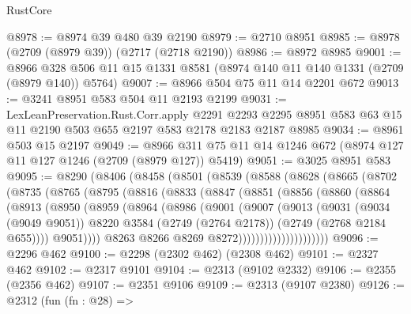 \begin{lexlean}{RustCore}
\begin{coremodule}
@8978 := @8974 @39 @480 @39 @2190
@8979 := @2710 @8951
@8985 := @8978 (@2709 (@8979 @39)) (@2717 (@2718 @2190))
@8986 := @8972 @8985
@9001 := @8966 @328 @506 @11 @15 @1331 @8581 (@8974 @140 @11 @140 @1331 (@2709 (@8979 @140)) @5764)
@9007 := @8966 @504 @75 @11 @14 @2201 @672
@9013 := @3241 @8951 @583 @504 @11 @2193 @2199
@9031 := LexLeanPreservation.Rust.Corr.apply
    @2291
    @2293
    @2295
    @8951
    @583
    @63
    @15
    @11
    @2190
    @503
    @655
    @2197
    @583
    @2178
    @2183
    @2187
    @8985
@9034 := @8961 @503 @15 @2197
@9049 := @8966 @311 @75 @11 @14 @1246 @672 (@8974 @127 @11 @127 @1246 (@2709 (@8979 @127)) @5419)
@9051 := @3025 @8951 @583
@9095 := @8290
    (@8406
      (@8458
        (@8501
          (@8539
            (@8588
              (@8628
                (@8665
                  (@8702
                    (@8735
                      (@8765
                        (@8795
                          (@8816
                            (@8833
                              (@8847
                                (@8851
                                  (@8856
                                    (@8860
                                      (@8864
                                        (@8913
                                          (@8950
                                            (@8959
                                              (@8964
                                                (@8986
                                                  (@9001
                                                    (@9007
                                                      (@9013
                                                        (@9031
                                                          (@9034 (@9049 @9051))
                                                          @8220
                                                          @3584
                                                          (@2749 (@2764 @2178))
                                                          (@2749 (@2768 @2184 @655))))
                                                      @9051))))
                                              @8263
                                              @8266
                                              @8269
                                              @8272)))))))))))))))))))))
@9096 := @2296 @462
@9100 := @2298 (@2302 @462) (@2308 @462)
@9101 := @2327 @462
@9102 := @2317 @9101
@9104 := @2313 (@9102 @2332)
@9106 := @2355 (@2356 @462)
@9107 := @2351 @9106
@9109 := @2313 (@9107 @2380)
@9126 := @2312
    (fun (fn : @28) =>

\end{coremodule}
\end{lexlean}
